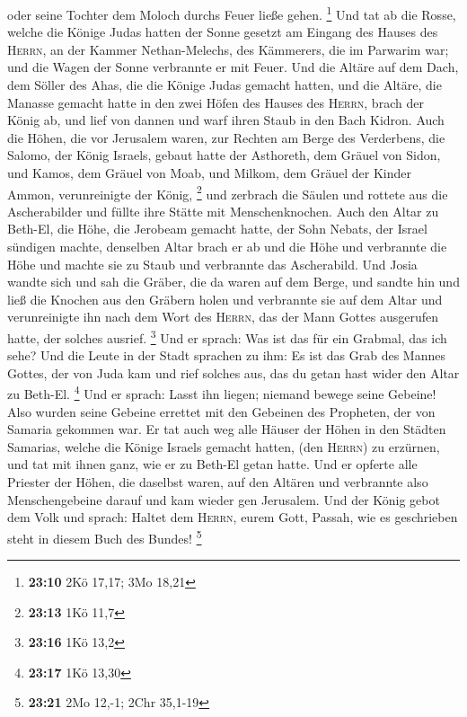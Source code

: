 oder seine Tochter dem Moloch durchs Feuer ließe gehen. \footnote{\textbf{23:10}
  2Kö 17,17; 3Mo 18,21}  Und tat ab die Rosse, welche die
Könige Judas hatten der Sonne gesetzt am Eingang des Hauses des
\textsc{Herrn}, an der Kammer Nethan-Melechs, des Kämmerers, die im
Parwarim war; und die Wagen der Sonne verbrannte er mit Feuer.
 Und die Altäre auf dem Dach, dem Söller des Ahas, die
die Könige Judas gemacht hatten, und die Altäre, die Manasse gemacht
hatte in den zwei Höfen des Hauses des \textsc{Herrn}, brach der König
ab, und lief von dannen und warf ihren Staub in den Bach Kidron.
 Auch die Höhen, die vor Jerusalem waren, zur Rechten am
Berge des Verderbens, die Salomo, der König Israels, gebaut hatte der
Asthoreth, dem Gräuel von Sidon, und Kamos, dem Gräuel von Moab, und
Milkom, dem Gräuel der Kinder Ammon, verunreinigte der König,
\footnote{\textbf{23:13} 1Kö 11,7}  und zerbrach die
Säulen und rottete aus die Ascherabilder und füllte ihre Stätte mit
Menschenknochen.  Auch den Altar zu Beth-El, die Höhe,
die Jerobeam gemacht hatte, der Sohn Nebats, der Israel sündigen machte,
denselben Altar brach er ab und die Höhe und verbrannte die Höhe und
machte sie zu Staub und verbrannte das Ascherabild.  Und
Josia wandte sich und sah die Gräber, die da waren auf dem Berge, und
sandte hin und ließ die Knochen aus den Gräbern holen und verbrannte sie
auf dem Altar und verunreinigte ihn nach dem Wort des \textsc{Herrn},
das der Mann Gottes ausgerufen hatte, der solches ausrief. \footnote{\textbf{23:16}
  1Kö 13,2}  Und er sprach: Was ist das für ein Grabmal,
das ich sehe? Und die Leute in der Stadt sprachen zu ihm: Es ist das
Grab des Mannes Gottes, der von Juda kam und rief solches aus, das du
getan hast wider den Altar zu Beth-El. \footnote{\textbf{23:17} 1Kö
  13,30}  Und er sprach: Lasst ihn liegen; niemand bewege
seine Gebeine! Also wurden seine Gebeine errettet mit den Gebeinen des
Propheten, der von Samaria gekommen war.  Er tat auch weg
alle Häuser der Höhen in den Städten Samarias, welche die Könige Israels
gemacht hatten, (den \textsc{Herrn}) zu erzürnen, und tat mit ihnen
ganz, wie er zu Beth-El getan hatte.  Und er opferte alle
Priester der Höhen, die daselbst waren, auf den Altären und verbrannte
also Menschengebeine darauf und kam wieder gen Jerusalem.
 Und der König gebot dem Volk und sprach: Haltet dem
\textsc{Herrn}, eurem Gott, Passah, wie es geschrieben steht in diesem
Buch des Bundes! \footnote{\textbf{23:21} 2Mo 12,-1; 2Chr 35,1-19}

